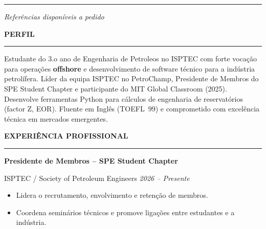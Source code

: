 \documentclass[10pt,a4paper]{article}
\renewcommand{\textbf}[1]{{\bfseries\color{cvgold}#1}}
\newcommand{\mainSection}[1]{%
  \vspace{1pt}%
  {\bfseries\color{cvgold}\large\MakeUppercase{#1}}%
  \par\vspace{0pt}%
  {\color{cvgold}\rule{\linewidth}{0.9pt}}%
  \par\vspace{1pt}%
}
\newcommand{\expEntry}[3]{%
  {\bfseries\color{cvgold}\normalsize #1}\par\vspace{1pt}%
  {\color{cvmuted}\small #2 \hfill \textit{\color{cvgoldlt}#3}}\par\vspace{1pt}%
}
\begin{document}
\begin{minipage}[t]{0.283\paperwidth}
\begin{minipage}[t]{\dimexpr\linewidth-18pt}
    \vspace{2pt}
    \begin{center}
      {\color{cvgold}\rule{0.55\linewidth}{0.4pt}}\par\vspace{2pt}
      {\color{cvgoldlt}\small\itshape Referências disponíveis a pedido}
    \end{center}

  \end{minipage}
\end{minipage}%
%
\hspace*{10pt}%
\begin{minipage}[t]{\dimexpr 0.705\paperwidth - 26pt}
  \color{cvwhite}
  \setlength{\parskip}{1pt}

  \vspace{5pt}


  \mainSection{Perfil}
  Estudante do 3.o ano de Engenharia de Petroleos no ISPTEC com forte vocação para
  operações \textbf{offshore} e desenvolvimento de software técnico para a indústria
  petrolífera. Líder da equipa ISPTEC no PetroChamp, Presidente de Membros do SPE
  Student Chapter e participante do MIT Global Classroom (2025). Desenvolve ferramentas
  Python para cálculos de engenharia de reservatórios (factor Z, EOR). Fluente em
  Inglês (TOEFL~99) e comprometido com excelência técnica em mercados emergentes.

  \mainSection{Experiência Profissional}

  \expEntry{Presidente de Membros -- SPE Student Chapter}%
           {ISPTEC / Society of Petroleum Engineers}%
           {2026 – Presente}
  \begin{itemize}
    \item Lidera o recrutamento, envolvimento e retenção de membros.
    \item Coordena seminários técnicos e promove ligações entre estudantes e a indústria.
  \end{itemize}


\end{minipage}
\end{document}
